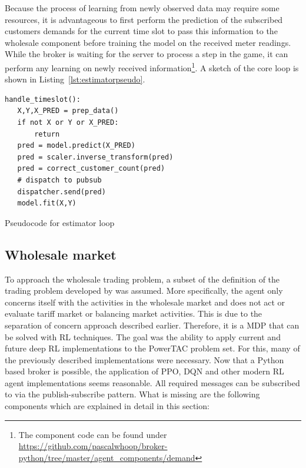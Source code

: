 Because the process of learning from newly observed data may require some resources, it is advantageous to
first perform the prediction of the subscribed customers demands for the current time slot to pass this information to
the wholesale component before training the model on the received meter readings. While the broker is waiting for the
server to process a step in the game, it can perform any learning on newly received information\footnote{The component code can be
found under \url{https://github.com/pascalwhoop/broker-python/tree/master/agent_components/demand}}. A sketch of the
core loop is shown in Listing~\ref{lst:estimatorpseudo}.

\begin{listing}
    \begin{verbatim}
handle_timeslot():
   X,Y,X_PRED = prep_data()
   if not X or Y or X_PRED:
       return
   pred = model.predict(X_PRED)
   pred = scaler.inverse_transform(pred)
   pred = correct_customer_count(pred)
   # dispatch to pubsub
   dispatcher.send(pred)
   model.fit(X,Y)
    \end{verbatim}
    \caption{Pseudocode for estimator loop}
    \label{lst:estimatorpseudo}
\end{listing}




\subsection{Wholesale market}
\label{sec:wholesale_market}

To approach the wholesale trading problem, a subset of the definition of the trading problem developed by
\citet{tactexurieli2016mdp} was assumed. More specifically, the agent only concerns itself with the activities in the
wholesale market and does not act or evaluate tariff market or balancing market activities. This is due to the
separation of concern approach described earlier. Therefore, it is a \ac{MDP} that can be solved with \ac{RL} techniques.
The goal was the ability to apply current and future deep \ac{RL} implementations to the \ac{PowerTAC} problem set. For this,
many of the previously described implementations were necessary. Now that a Python based broker is possible, the application
of \ac{PPO}, \ac{DQN} and other modern \ac{RL} agent implementations seems reasonable. All required messages can be
subscribed to via the publish-subscribe pattern. What is missing are the following components which are explained in
detail in this section:

